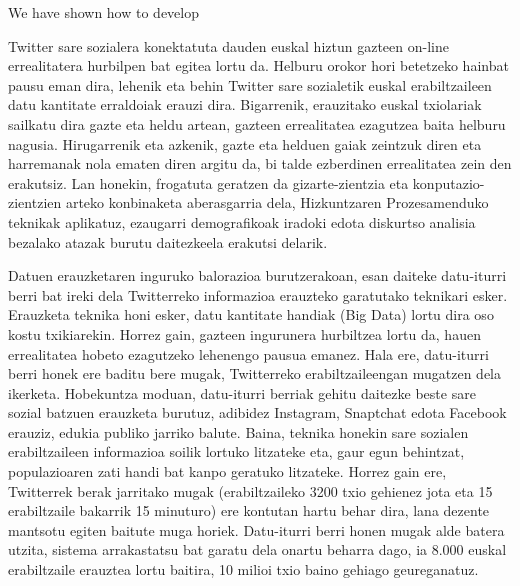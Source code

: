 \documentclass[information,article,submit,moreauthors,pdftex,10pt,a4paper]{Definitions/mdpi}
\begin{document}
We have shown how to develop 

Twitter sare sozialera konektatuta dauden euskal hiztun gazteen on-line errealitatera hurbilpen bat egitea lortu da. Helburu orokor hori betetzeko hainbat pausu eman dira, lehenik eta behin Twitter sare sozialetik euskal erabiltzaileen datu kantitate erraldoiak erauzi dira. Bigarrenik, erauzitako euskal txiolariak sailkatu dira gazte eta heldu artean, gazteen errealitatea ezagutzea baita helburu nagusia. Hirugarrenik eta azkenik, gazte eta helduen gaiak zeintzuk diren eta harremanak nola ematen diren argitu da, bi talde ezberdinen errealitatea zein den erakutsiz. Lan honekin, frogatuta geratzen da gizarte-zientzia eta konputazio-zientzien arteko konbinaketa aberasgarria dela, Hizkuntzaren Prozesamenduko teknikak aplikatuz, ezaugarri demografikoak iradoki edota diskurtso analisia bezalako atazak burutu daitezkeela erakutsi delarik.

Datuen erauzketaren inguruko balorazioa burutzerakoan, esan daiteke datu-iturri berri bat ireki dela Twitterreko informazioa erauzteko garatutako teknikari esker. Erauzketa teknika honi esker, datu kantitate handiak (Big Data) lortu dira oso kostu txikiarekin. Horrez gain, gazteen ingurunera hurbiltzea lortu da, hauen errealitatea hobeto ezagutzeko lehenengo pausua emanez. Hala ere, datu-iturri berri honek ere baditu bere mugak, Twitterreko erabiltzaileengan mugatzen dela ikerketa. Hobekuntza moduan, datu-iturri berriak gehitu daitezke beste sare sozial batzuen erauzketa burutuz, adibidez Instagram, Snaptchat edota Facebook erauziz, edukia publiko jarriko balute. Baina, teknika honekin sare sozialen erabiltzaileen informazioa soilik lortuko litzateke eta, gaur egun behintzat, populazioaren zati handi bat kanpo geratuko litzateke. Horrez gain ere, Twitterrek berak jarritako mugak (erabiltzaileko 3200 txio gehienez jota eta 15 erabiltzaile bakarrik 15 minuturo) ere kontutan hartu behar dira, lana dezente mantsotu egiten baitute muga horiek. Datu-iturri berri honen mugak alde batera utzita, sistema arrakastatsu bat garatu dela onartu beharra dago, ia 8.000 euskal erabiltzaile erauztea lortu baitira, 10 milioi txio baino gehiago geureganatuz.
\end{document}
